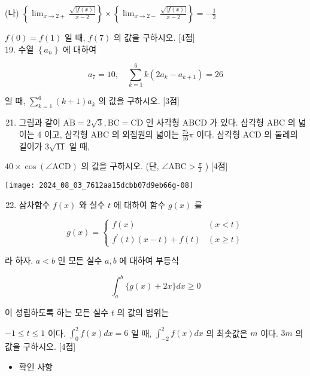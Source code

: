\documentclass[10pt]{article}
\begin{document}
(나) \(\left\{\lim _{x \rightarrow 2+} \frac{\sqrt{|f(x)|}}{x-2}\right\} \times\left\{\lim _{x \rightarrow 2-} \frac{\sqrt{|f(x)|}}{x-2}\right\}=-\frac{1}{2}\)

\(f(0)=f(1)\) 일 때, \(f(7)\) 의 값을 구하시오. [4점]\\
19. 수열 \(\left\{a_{n}\right\}\) 에 대하여

\[
a_{7}=10, \quad \sum_{k=1}^{6} k\left(2 a_{k}-a_{k+1}\right)=26
\]

일 때, \(\sum_{k=1}^{6}(k+1) a_{k}\) 의 값을 구하시오. [3점]

\begin{enumerate}
  \setcounter{enumi}{20}
  \item 그림과 같이 \(\overline{\mathrm{AB}}=2 \sqrt{3}, \overline{\mathrm{BC}}=\overline{\mathrm{CD}}\) 인 사각형 ABCD 가 있다. 삼각형 ABC 의 넓이는 4 이고, 삼각형 ABC 의 외접원의 넓이는 \(\frac{75}{16} \pi\) 이다. 삼각형 ACD 의 둘레의 길이가 \(3 \sqrt{11}\) 일 때,
\end{enumerate}

\(40 \times \cos (\angle \mathrm{ACD})\) 의 값을 구하시오. (단, \(\angle \mathrm{ABC}>\frac{\pi}{2}\) ) [4점]

\begin{center}
\texttt{[image: 2024\_08\_03\_7612aa15dcbb07d9eb66g-08]}
\end{center}

\begin{enumerate}
  \setcounter{enumi}{21}
  \item 삼차함수 \(f(x)\) 와 실수 \(t\) 에 대하여 함수 \(g(x)\) 를
\end{enumerate}

\[
g(x)= \begin{cases}f(x) & (x<t) \\ f^{\prime}(t)(x-t)+f(t) & (x \geq t)\end{cases}
\]

라 하자. \(a<b\) 인 모든 실수 \(a, b\) 에 대하여 부등식

\[
\int_{a}^{b}\{g(x)+2 x\} d x \geq 0
\]

이 성립하도록 하는 모든 실수 \(t\) 의 값의 범위는

\(-1 \leq t \leq 1\) 이다. \(\int_{0}^{2} f(x) d x=6\) 일 때, \(\int_{-2}^{2} f(x) d x\) 의 최솟값은 \(m\) 이다. \(3 m\) 의 값을 구하시오. [4점]

\begin{itemize}
  \item 확인 사항
\end{itemize}
\end{document}
